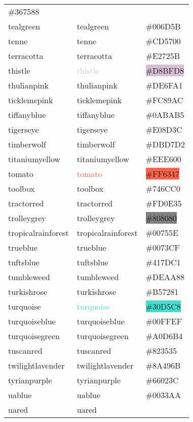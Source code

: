 \documentclass[
]{article}
\begin{document}
\begin{longtable}[]{@{}lll@{}}
\colorbox{tealblue}{\#367588}\tabularnewline
tealgreen & \textcolor{tealgreen}{tealgreen} &
\colorbox{tealgreen}{\#006D5B}\tabularnewline
tenne & \textcolor{tenne}{tenne} &
\colorbox{tenne}{\#CD5700}\tabularnewline
terracotta & \textcolor{terracotta}{terracotta} &
\colorbox{terracotta}{\#E2725B}\tabularnewline
thistle & \textcolor{thistle}{thistle} &
\colorbox{thistle}{\#D8BFD8}\tabularnewline
thulianpink & \textcolor{thulianpink}{thulianpink} &
\colorbox{thulianpink}{\#DE6FA1}\tabularnewline
ticklemepink & \textcolor{ticklemepink}{ticklemepink} &
\colorbox{ticklemepink}{\#FC89AC}\tabularnewline
tiffanyblue & \textcolor{tiffanyblue}{tiffanyblue} &
\colorbox{tiffanyblue}{\#0ABAB5}\tabularnewline
tigerseye & \textcolor{tigerseye}{tigerseye} &
\colorbox{tigerseye}{\#E08D3C}\tabularnewline
timberwolf & \textcolor{timberwolf}{timberwolf} &
\colorbox{timberwolf}{\#DBD7D2}\tabularnewline
titaniumyellow & \textcolor{titaniumyellow}{titaniumyellow} &
\colorbox{titaniumyellow}{\#EEE600}\tabularnewline
tomato & \textcolor{tomato}{tomato} &
\colorbox{tomato}{\#FF6347}\tabularnewline
toolbox & \textcolor{toolbox}{toolbox} &
\colorbox{toolbox}{\#746CC0}\tabularnewline
tractorred & \textcolor{tractorred}{tractorred} &
\colorbox{tractorred}{\#FD0E35}\tabularnewline
trolleygrey & \textcolor{trolleygrey}{trolleygrey} &
\colorbox{gray}{\#808080}\tabularnewline
tropicalrainforest & \textcolor{tropicalrainforest}{tropicalrainforest}
& \colorbox{tropicalrainforest}{\#00755E}\tabularnewline
trueblue & \textcolor{trueblue}{trueblue} &
\colorbox{trueblue}{\#0073CF}\tabularnewline
tuftsblue & \textcolor{tuftsblue}{tuftsblue} &
\colorbox{tuftsblue}{\#417DC1}\tabularnewline
tumbleweed & \textcolor{tumbleweed}{tumbleweed} &
\colorbox{tumbleweed}{\#DEAA88}\tabularnewline
turkishrose & \textcolor{turkishrose}{turkishrose} &
\colorbox{turkishrose}{\#B57281}\tabularnewline
turquoise & \textcolor{turquoise}{turquoise} &
\colorbox{turquoise}{\#30D5C8}\tabularnewline
turquoiseblue & \textcolor{turquoiseblue}{turquoiseblue} &
\colorbox{turquoiseblue}{\#00FFEF}\tabularnewline
turquoisegreen & \textcolor{turquoisegreen}{turquoisegreen} &
\colorbox{turquoisegreen}{\#A0D6B4}\tabularnewline
tuscanred & \textcolor{tuscanred}{tuscanred} &
\colorbox{tuscanred}{\#823535}\tabularnewline
twilightlavender & \textcolor{twilightlavender}{twilightlavender} &
\colorbox{twilightlavender}{\#8A496B}\tabularnewline
tyrianpurple & \textcolor{tyrianpurple}{tyrianpurple} &
\colorbox{tyrianpurple}{\#66023C}\tabularnewline
uablue & \textcolor{uablue}{uablue} &
\colorbox{uablue}{\#0033AA}\tabularnewline
uared & \textcolor{uared}{uared} &

\end{longtable}
\end{document}

